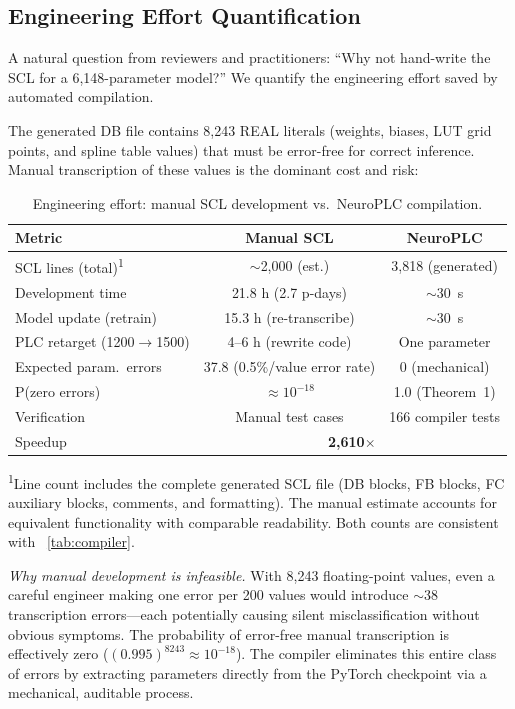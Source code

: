 \documentclass[journal,onecolumn]{IEEEtran}
\begin{document}
\subsection{Engineering Effort Quantification}
\label{sec:engineering}

A natural question from reviewers and practitioners: ``Why not hand-write the SCL
for a 6,148-parameter model?'' We quantify the engineering effort saved by
automated compilation.

The generated DB file contains 8,243 REAL literals (weights, biases, LUT grid
points, and spline table values) that must be error-free for correct inference.
Manual transcription of these values is the dominant cost and risk:

\begin{table}[t]
\centering
\caption{Engineering effort: manual SCL development vs.\ NeuroPLC compilation.}
\label{tab:engineering}
\begin{tabular}{p{2.8cm}cc}
\toprule
\textbf{Metric} & \textbf{Manual SCL} & \textbf{NeuroPLC} \\
\midrule
SCL lines (total)\textsuperscript{1} & $\sim$2,000 (est.) & 3,818 (generated) \\
Development time        & 21.8 h (2.7 p-days) & $\sim$30~s \\
Model update (retrain)  & 15.3 h (re-transcribe) & $\sim$30~s \\
PLC retarget (1200$\rightarrow$1500) & 4--6 h (rewrite code) & One parameter \\
Expected param.\ errors & 37.8 (0.5\%/value error rate) & 0 (mechanical) \\
P(zero errors)          & $\approx 10^{-18}$ & 1.0 (Theorem~1) \\
Verification            & Manual test cases & 166 compiler tests \\
\midrule
Speedup                 & \multicolumn{2}{c}{\textbf{2,610$\times$}} \\
\bottomrule
\end{tabular}

\vspace{2pt}
{\scriptsize \textsuperscript{1}Line count includes the complete generated SCL file
(DB blocks, FB blocks, FC auxiliary blocks, comments, and formatting).
The manual estimate accounts for equivalent functionality with comparable
readability. Both counts are consistent with \tablename~\ref{tab:compiler}.}
\end{table}

\textit{Why manual development is infeasible.} With 8,243 floating-point values,
even a careful engineer making one error per 200 values would introduce $\sim$38
transcription errors---each potentially causing silent misclassification without
obvious symptoms. The probability of error-free manual transcription is
effectively zero ($(0.995)^{8243} \approx 10^{-18}$). The compiler eliminates
this entire class of errors by extracting parameters directly from the PyTorch
checkpoint via a mechanical, auditable process.
\end{document}
